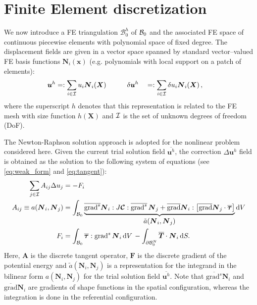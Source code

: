 \documentclass[times,doublespace]{nmeauth}
\def\gz  #1{           \mbox{$\boldsymbol{#1}$}}
\def\grad {\mbox{grad}}
\def\d {\mbox{d}}
\def\mcl  #1{               {\cal #1}}
\begin{document}
\section{Finite Element discretization}
\label{sec:fe}

We now introduce a FE triangulation $\mathcal{B}^h_0$ of $\mcl B_0$ and
the associated FE space of continuous piecewise elements with polynomial space of fixed degree. %
The displacement fields are given in
a vector space spanned by standard vector--valued FE basis functions $\gz N_i(\gz x)$ (e.g. polynomials with local support on a patch of elements):
\begin{alignat}{2}
       \gz u^h &=:  \sum_{i \in \mcl I} u_i \gz N_i (\gz X) \quad \quad \quad
\delta \gz u^h &&=: \sum_{i \in \mcl I} \delta u_i \gz N_i (\gz X) \,,
\end{alignat}
where the superscript $h$ denotes that this representation is related to the FE mesh with size function $h(\gz X)$ and $\mcl I$ is the set of unknown degrees of freedom (DoF).

The Newton-Raphson solution approach is adopted for the nonlinear problem considered here.
Given the current trial solution field $\overline{\gz u^h}$, the correction $\Delta \gz u^h$ field is obtained as the solution to the following system of equations (see \eqref{eq:weak_form} and \eqref{eq:tangent}):
\begin{align}
  \sum_{j \in \mcl I} A_{ij} \Delta u_j &= - F_i  \label{eq:linear_system} \\
  A_{ij} \equiv a(\gz N_i, \gz N_j) &=
  \int_{\mcl B_0}
  \underbrace{
  \overline{\grad^s} \gz N_i : J \boldsymbol{\mathcal{C}} : \overline{\grad^s} \, \gz N_j
  +
  \overline{\grad}\gz N_i :
  \left[
  \overline{\grad} \gz N_j \cdot
  \overline{\gz \tau}
  \right]
  }_{\displaystyle \tilde{a}(\gz N_i, \gz N_j)}
  \d V
  \label{eq:algebraic_tangent}
  \\
  F_i &=
  \int_{\mcl B_0} \overline{\gz \tau} : \grad^{s} \, \gz N_i \, \d V \,
  -
  \int_{\partial \mcl B_0^N} \overline{\gz T} \cdot \gz N_i \, \d S.
\end{align}
Here, $\gz A$ is the discrete tangent {\color{red}operator}, $\gz F$ is the discrete gradient {\color{red}of the potential energy}
and $\tilde{a}(\gz N_i, \gz N_j)$ is a representation for the integrand in the bilinear form $a(\gz N_i, \gz N_j)$ for the trial solution field $\overline{\gz u^h}$.
Note that $\overline{\grad^s} \gz N_i$ and $\overline{\grad} \gz N_i$ are gradients of shape functions in the {\color{red}spatial} configuration, whereas the integration is done in the {\color{red}referential} configuration.
\end{document}
